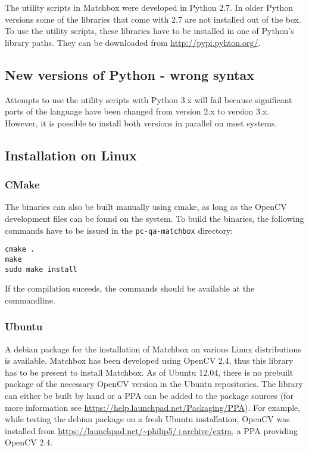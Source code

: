 \documentclass{hitec}
\begin{document}
The utility scripts in Matchbox were developed in Python 2.7. In older Python
versions some of the libraries that come with 2.7 are not installed out of the box. 
To use the utility scripts, these libraries have to be installed in one of Python's
library paths. They can be downloaded from \url{http://pypi.pyhton.org/}.

\subsection{New versions of Python - wrong syntax}

Attempts to use the utility scripts with Python 3.x will fail because
significant parts of the language have been changed from version 2.x to version
3.x. However, it is possible to install both versions in parallel on most
systems.

\subsection{Installation on Linux}

\subsubsection*{CMake}
The binaries can also be 
built manually using cmake, as long as the OpenCV development files can be found on the system.
To build the binaries, the following commands have to be issued in the \verb+pc-qa-matchbox+
directory:
\begin{verbatim}
cmake .
make
sudo make install
\end{verbatim}
If the compilation suceeds, the commands should be available at the commandline.



\subsubsection*{Ubuntu}
A debian package for the installation of Matchbox on various Linux distributions
is available. Matchbox has been developed using OpenCV 2.4, thus this
library has to be present to install Matchbox. 
As of Ubuntu 12.04, there is no prebuilt package of the necessary OpenCV version
in the Ubuntu repositories. The library can either be built by hand or a PPA can be
added to the package sources (for more information see \url{https://help.launchpad.net/Packaging/PPA}). 
For example, while testing the debian package on a fresh Ubuntu installation, OpenCV was installed
from \url{https://launchpad.net/~philip5/+archive/extra}, a PPA providing OpenCV 2.4. 
\end{document}
